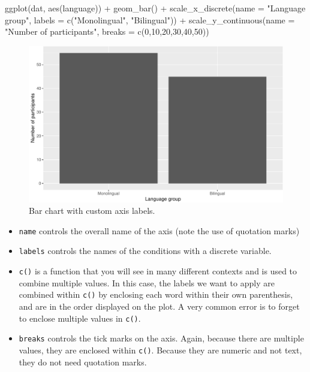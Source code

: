 \documentclass[
  english,
  doc,floatsintext]{apa6}
\newenvironment{Shaded}{\begin{snugshade}}{\end{snugshade}}
\newcommand{\AttributeTok}[1]{\textcolor[rgb]{0.77,0.63,0.00}{#1}}
\newcommand{\DecValTok}[1]{\textcolor[rgb]{0.00,0.00,0.81}{#1}}
\newcommand{\FunctionTok}[1]{\textcolor[rgb]{0.00,0.00,0.00}{#1}}
\newcommand{\NormalTok}[1]{#1}
\newcommand{\SpecialCharTok}[1]{\textcolor[rgb]{0.00,0.00,0.00}{#1}}
\newcommand{\StringTok}[1]{\textcolor[rgb]{0.31,0.60,0.02}{#1}}
\begin{document}
\begin{Shaded}
\begin{Highlighting}[]
\FunctionTok{ggplot}\NormalTok{(dat, }\FunctionTok{aes}\NormalTok{(language)) }\SpecialCharTok{+}
  \FunctionTok{geom\_bar}\NormalTok{() }\SpecialCharTok{+}
  \FunctionTok{scale\_x\_discrete}\NormalTok{(}\AttributeTok{name =} \StringTok{"Language group"}\NormalTok{, }
                   \AttributeTok{labels =} \FunctionTok{c}\NormalTok{(}\StringTok{"Monolingual"}\NormalTok{, }\StringTok{"Bilingual"}\NormalTok{)) }\SpecialCharTok{+}
  \FunctionTok{scale\_y\_continuous}\NormalTok{(}\AttributeTok{name =} \StringTok{"Number of participants"}\NormalTok{,}
                     \AttributeTok{breaks =} \FunctionTok{c}\NormalTok{(}\DecValTok{0}\NormalTok{,}\DecValTok{10}\NormalTok{,}\DecValTok{20}\NormalTok{,}\DecValTok{30}\NormalTok{,}\DecValTok{40}\NormalTok{,}\DecValTok{50}\NormalTok{))}
\end{Highlighting}
\end{Shaded}

\begin{figure}

{\centering \includegraphics[width=1\linewidth]{images/bar3-1} 

}

\caption{Bar chart with custom axis labels.}\label{fig:bar3}
\end{figure}

\begin{itemize}
\item
  \texttt{name} controls the overall name of the axis (note the use of quotation marks)
\item
  \texttt{labels} controls the names of the conditions with a discrete variable.
\item
  \texttt{c()} is a function that you will see in many different contexts and is used to combine multiple values. In this case, the labels we want to apply are combined within \texttt{c()} by enclosing each word within their own parenthesis, and are in the order displayed on the plot. A very common error is to forget to enclose multiple values in \texttt{c()}.
\item
  \texttt{breaks} controls the tick marks on the axis. Again, because there are multiple values, they are enclosed within \texttt{c()}. Because they are numeric and not text, they do not need quotation marks.
\end{itemize}
\end{document}
